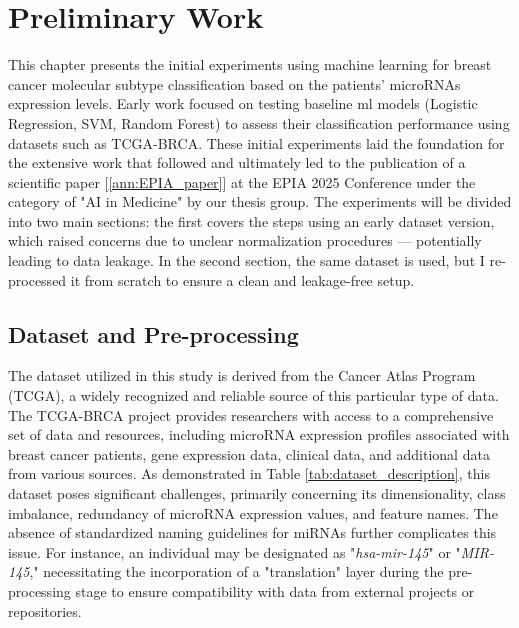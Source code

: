 
%
\chapter{Preliminary Work}

This chapter presents the initial experiments using machine learning for breast
cancer molecular subtype classification based on the patients’ microRNAs
expression levels. Early work focused on testing baseline \gls{ml} models
(Logistic Regression, SVM, Random Forest) to assess their classification
performance using datasets such as TCGA-BRCA. These initial experiments laid
the foundation for the extensive work that followed and ultimately led to the
publication of a scientific paper [\ref{ann:EPIA_paper}] at the EPIA 2025
Conference under the category of "AI in Medicine" by our thesis group. The
experiments will be divided into two main sections: the first covers the steps
using an early dataset version, which raised concerns due to unclear
normalization procedures — potentially leading to data leakage. In the second
section, the same dataset is used, but I re-processed it from scratch to ensure
a clean and leakage-free setup.

\section{Dataset and Pre-processing}
The dataset utilized in this study is derived from the Cancer Atlas Program
(TCGA), a widely recognized and reliable source of this particular type of
data. The TCGA-BRCA project provides researchers with access to a comprehensive
set of data and resources, including microRNA expression profiles associated
with breast cancer patients, gene expression data, clinical data, and
additional data from various sources. As demonstrated in Table
\ref{tab:dataset_description}, this dataset poses significant challenges,
primarily concerning its dimensionality, class imbalance, redundancy of
microRNA expression values, and feature names. The absence of standardized
naming guidelines for miRNAs further complicates this issue. For instance, an
individual may be designated as "\textit{hsa-mir-145}" or "\textit{MIR-145},"
necessitating the incorporation of a "translation" layer during the
pre-processing stage to ensure compatibility with data from external projects
or repositories.

